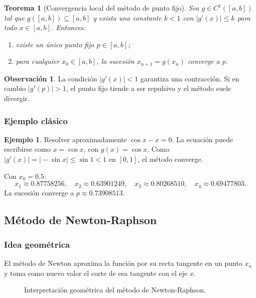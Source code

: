 \documentclass[a4paper,12pt]{article}
\theoremstyle{definition}
\newtheorem{ejemplo}{Ejemplo}[section]
\newtheorem{observacion}{Observación}[section]
\theoremstyle{plain}
\newtheorem{teorema}{Teorema}[section]
\begin{document}
\begin{teorema}[Convergencia local del método de punto fijo]
Sea $g\in C^1([a,b])$ tal que $g([a,b])\subseteq [a,b]$ y exista una constante
$k<1$ con $|g'(x)|\le k$ para todo $x\in[a,b]$. Entonces:
\begin{enumerate}[label=\roman*)]
    \item existe un único punto fijo $p\in[a,b]$;
    \item para cualquier $x_0\in[a,b]$, la sucesión $x_{n+1}=g(x_n)$
          converge a $p$.
\end{enumerate}
\end{teorema}

\begin{observacion}
La condición $|g'(x)|<1$ garantiza una contracción. Si en cambio $|g'(p)|>1$,
el punto fijo tiende a ser repulsivo y el método suele divergir.
\end{observacion}

\subsubsection{Ejemplo clásico}

\begin{ejemplo}
Resolver aproximadamente $\cos x - x = 0$.
La ecuación puede escribirse como $x=\cos x$, con $g(x)=\cos x$.
Como $|g'(x)|=|\!-\!\sin x|\le \sin 1 < 1$ en $[0,1]$, el método converge.

Con $x_0=0.5$:
\[
x_1\approx 0.87758256,\quad x_2\approx 0.63901249,\quad
x_3\approx 0.80268510,\quad x_4\approx 0.69477803.
\]
La sucesión converge a $p\approx 0.73908513$.
\end{ejemplo}

\subsection{Método de Newton-Raphson}

\subsubsection{Idea geométrica}

El método de Newton aproxima la función por su recta tangente en un punto $x_n$
y toma como nuevo valor el corte de esa tangente con el eje $x$.

\begin{figure}[H]
\centering
{}
\caption{Interpretación geométrica del método de Newton-Raphson.}
\end{figure}
\end{document}
